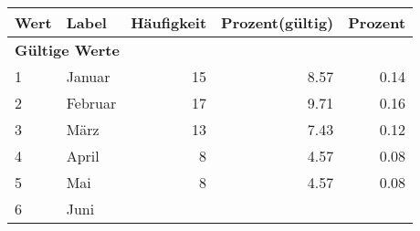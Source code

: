      \begin{longtable}{lXrrr}
     \toprule
     \textbf{Wert} & \textbf{Label} & \textbf{Häufigkeit} & \textbf{Prozent(gültig)} & \textbf{Prozent} \\
     \endhead
     \midrule
     \multicolumn{5}{l}{\textbf{Gültige Werte}}\\

     1 &
     \multicolumn{1}{X}{ Januar   } &


       \num{15} &
       \num[round-mode=places,round-precision=2]{8.57} &
         \num[round-mode=places,round-precision=2]{0.14} \\

     2 &
     \multicolumn{1}{X}{ Februar   } &


       \num{17} &
       \num[round-mode=places,round-precision=2]{9.71} &
         \num[round-mode=places,round-precision=2]{0.16} \\

     3 &
     \multicolumn{1}{X}{ März   } &


       \num{13} &
       \num[round-mode=places,round-precision=2]{7.43} &
         \num[round-mode=places,round-precision=2]{0.12} \\

     4 &
     \multicolumn{1}{X}{ April   } &


       \num{8} &
       \num[round-mode=places,round-precision=2]{4.57} &
         \num[round-mode=places,round-precision=2]{0.08} \\

     5 &
     \multicolumn{1}{X}{ Mai   } &


       \num{8} &
       \num[round-mode=places,round-precision=2]{4.57} &
         \num[round-mode=places,round-precision=2]{0.08} \\

     6 &
     \multicolumn{1}{X}{ Juni   } &



\end{longtable}
